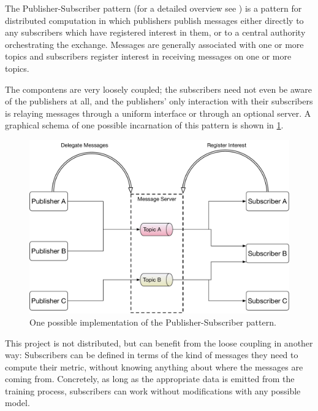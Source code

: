 The Publisher-Subscriber pattern (for a detailed overview see
\cite{eugster2003}) is a pattern for distributed computation in which publishers
publish messages either directly to any subscribers which have registered
interest in them, or to a central authority orchestrating the exchange. Messages
are generally associated with one or more topics and subscribers register
interest in receiving messages on one or more topics.

The compontens are very loosely coupled; the subscribers need not even
be aware of the publishers at all, and the publishers' only interaction
with their subscribers is relaying messages through a uniform interface
or through an optional server. A graphical schema of one possible
incarnation of this pattern is shown in \cref{fig:pubsub}.

\begin{figure}
    \hypertarget{fig:pubsub}{%
        \centering
        \includegraphics[max width=\textwidth]{gfx/diagrams/architecture_diagrams/pubsub.pdf}
        \caption{One possible implementation of the Publisher-Subscriber pattern.}\label{fig:pubsub}
    }
\end{figure}

This project is not distributed, but can benefit from the loose coupling
in another way: Subscribers can be defined in terms of the kind of
messages they need to compute their metric, without knowing anything
about where the messages are coming from. Concretely, as long as the
appropriate data is emitted from the training process, subscribers can
work without modifications with any possible model.

